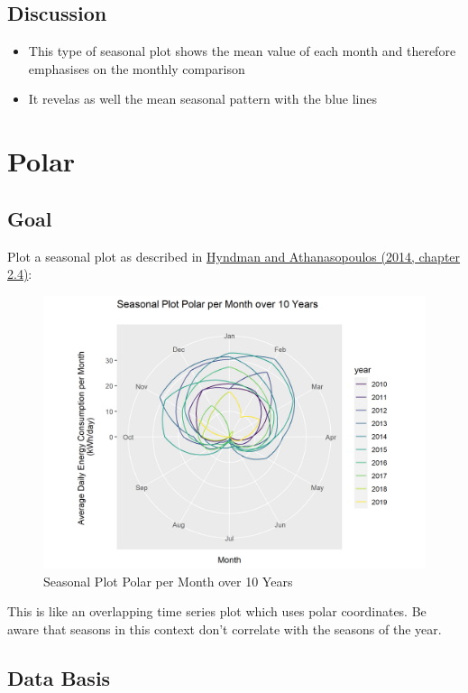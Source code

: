 \documentclass[
  a4paperpaper,
]{book}
\begin{document}
\hypertarget{discussion-2}{%
\subsection{Discussion}\label{discussion-2}}

\begin{itemize}
\item
  This type of seasonal plot shows the mean value of each month and therefore emphasises on the monthly comparison
\item
  It revelas as well the mean seasonal pattern with the blue lines
\end{itemize}

\newpage

\hypertarget{polar}{%
\section{Polar}\label{polar}}

\hypertarget{goal-8}{%
\subsection{Goal}\label{goal-8}}

Plot a seasonal plot as described in \href{https://otexts.com/fpp2/seasonal-plots.html}{Hyndman and Athanasopoulos (2014, chapter 2.4)}:

\begin{figure}
\includegraphics[width=0.7\linewidth]{images/plotSeasonalPolar} \caption{Seasonal Plot Polar per Month over 10 Years}\label{fig:unnamed-chunk-17}
\end{figure}

This is like an overlapping time series plot which uses polar coordinates. Be aware that seasons in this context don't correlate with the seasons of the year.

\hypertarget{data-basis-8}{%
\subsection{Data Basis}\label{data-basis-8}}
\end{document}
